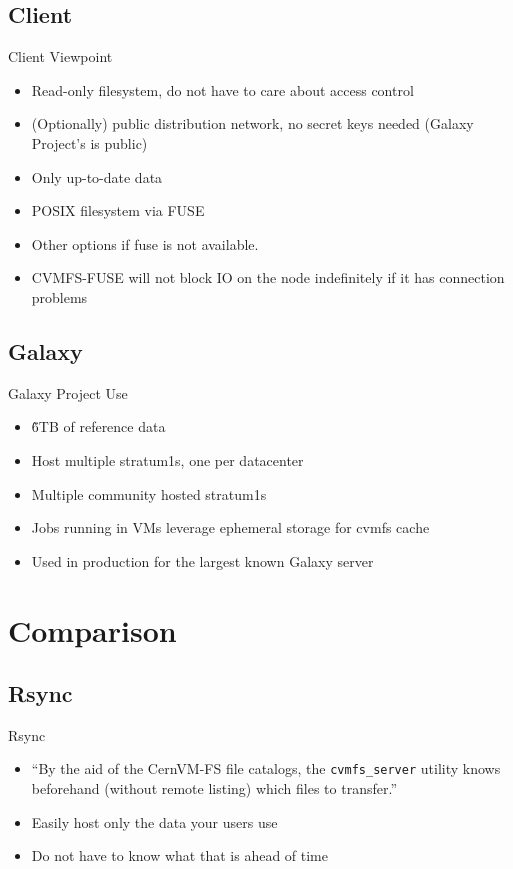 \documentclass[12pt]{ufrslides}
\begin{document}
\subsection{Client}
\begin{frame}{Client Viewpoint}
	\begin{itemize}
		\item Read-only filesystem, do not have to care about access control
		\item (Optionally) public distribution network, no secret keys needed (Galaxy Project's is public)
		\item Only up-to-date data
		\item POSIX filesystem via FUSE
		\item Other options if fuse is not available.
		\item CVMFS-FUSE will not block IO on the node indefinitely if it has connection problems
	\end{itemize}
\end{frame}

\subsection{Galaxy}
\begin{frame}{Galaxy Project Use}
	\begin{itemize}
		\item \~6TB of reference data
		\item Host multiple stratum1s, one per datacenter
		\item Multiple community hosted stratum1s
		\item Jobs running in VMs leverage ephemeral storage for cvmfs cache
		\item Used in production for the largest known Galaxy server
	\end{itemize}
\end{frame}

\section{Comparison}
\subsection{Rsync}
\begin{frame}{Rsync}
	\begin{itemize}
		\item ``By the aid of the CernVM-FS file catalogs, the \texttt{cvmfs\_server} utility knows beforehand (without remote listing) which files to transfer.''
		\item Easily host only the data your users use
		\item Do not have to know what that is ahead of time
	\end{itemize}
\end{frame}
\end{document}
